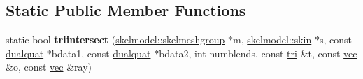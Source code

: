 \subsection*{Static Public Member Functions}
\begin{DoxyCompactItemize}
\item 
\mbox{\label{structskelhitzone_a1de3038dd07c9848a8abc667fa07b013}} 
static bool {\bfseries triintersect} (\hyperlink{structskelmodel_1_1skelmeshgroup}{skelmodel\+::skelmeshgroup} $\ast$m, \hyperlink{structanimmodel_1_1skin}{skelmodel\+::skin} $\ast$s, const \hyperlink{structdualquat}{dualquat} $\ast$bdata1, const \hyperlink{structdualquat}{dualquat} $\ast$bdata2, int numblends, const \hyperlink{structskelbih_1_1tri}{tri} \&t, const \hyperlink{structvec}{vec} \&o, const \hyperlink{structvec}{vec} \&ray)
\end{DoxyCompactItemize}
